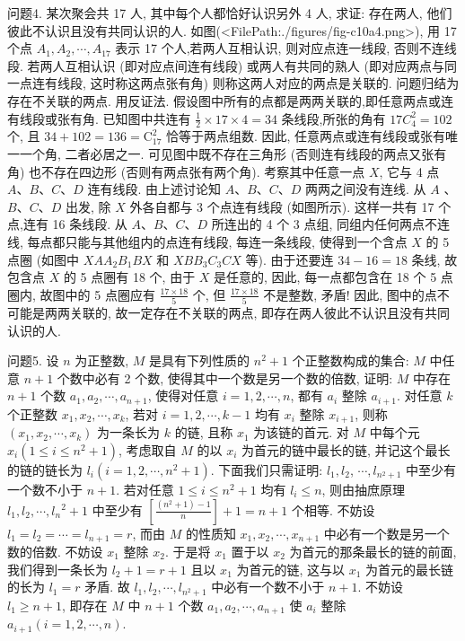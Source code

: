 问题4. 某次聚会共 17 人, 其中每个人都恰好认识另外 4 人, 求证: 存在两人, 他们彼此不认识且没有共同认识的人.
如图(<FilePath:./figures/fig-c10a4.png>), 用 17 个点 $A_1, A_2, \cdots, A_{17}$ 表示 17 个人,若两人互相认识, 则对应点连一线段, 否则不连线段.
若两人互相认识 (即对应点间连有线段) 或两人有共同的熟人 (即对应两点与同一点连有线段, 这时称这两点张有角) 则称这两人对应的两点是关联的.
问题归结为存在不关联的两点.
用反证法.
假设图中所有的点都是两两关联的,即任意两点或连有线段或张有角.
已知图中共连有 $\frac{1}{2} \times 17 \times 4=34$ 条线段,所张的角有 $17 C_4^2=102$ 个, 且 $34+102= 136=\mathrm{C}_{17}^2$ 恰等于两点组数.
因此, 任意两点或连有线段或张有唯一一个角, 二者必居之一.
可见图中既不存在三角形 (否则连有线段的两点又张有角) 也不存在四边形 (否则有两点张有两个角). 考察其中任意一点 $X$, 它与 4 点 $A 、 B 、 C 、 D$ 连有线段.
由上述讨论知 $A 、 B 、 C 、 D$ 两两之间没有连线.
从 $A$ 、 $B 、 C 、 D$ 出发, 除 $X$ 外各自都与 3 个点连有线段 (如图所示). 这样一共有 17 个点,连有 16 条线段.
从 $A 、 B 、 C 、 D$ 所连出的 4 个 3 点组, 同组内任何两点不连线, 每点都只能与其他组内的点连有线段, 每连一条线段, 使得到一个含点 $X$ 的 5 点圈 (如图中 $X A A_2 B_1 B X$ 和 $X B B_3 C_3 C X$ 等). 由于还要连 $34- 16=18$ 条线, 故包含点 $X$ 的 5 点圈有 18 个, 由于 $X$ 是任意的, 因此, 每一点都包含在 18 个 5 点圈内, 故图中的 5 点圈应有 $\frac{17 \times 18}{5}$ 个, 但 $\frac{17 \times 18}{5}$ 不是整数, 矛盾! 因此, 图中的点不可能是两两关联的, 故一定存在不关联的两点, 即存在两人彼此不认识且没有共同认识的人.



问题5. 设 $n$ 为正整数, $M$ 是具有下列性质的 $n^2+1$ 个正整数构成的集合: $M$ 中任意 $n+1$ 个数中必有 2 个数, 使得其中一个数是另一个数的倍数, 证明: $M$ 中存在 $n+1$ 个数 $a_1, a_2, \cdots, a_{n+1}$, 使得对任意 $i=1,2, \cdots, n$, 都有 $a_i$ 整除 $a_{i+1}$. 
对任意 $k$ 个正整数 $x_1, x_2, \cdots, x_k$, 若对 $i=1,2, \cdots, k-1$ 均有 $x_i$ 整除 $x_{i+1}$, 则称 $\left(x_1, x_2, \cdots, x_k\right)$ 为一条长为 $k$ 的链, 且称 $x_1$ 为该链的首元.
对 $M$ 中每个元 $x_i\left(1 \leqslant i \leqslant n^2+1\right)$, 考虑取自 $M$ 的以 $x_i$ 为首元的链中最长的链, 并记这个最长的链的链长为 $l_i\left(i=1,2, \cdots, n^2+1\right)$. 下面我们只需证明: $l_1, l_2$, $\cdots, l_{n^2+1}$ 中至少有一个数不小于 $n+1$. 若对任意 $1 \leqslant i \leqslant n^2+1$ 均有 $l_i \leqslant n$, 则由抽庶原理 $l_1, l_2, \cdots, l_n{ }^2+1$ 中至少有 $\left[\frac{\left(n^2+1\right)-1}{n}\right]+1=n+1$ 个相等.
不妨设 $l_1=l_2=\cdots=l_{n+1}=r$, 而由 $M$ 的性质知 $x_1, x_2, \cdots, x_{n+1}$ 中必有一个数是另一个数的倍数.
不妨设 $x_1$ 整除 $x_2$. 于是将 $x_1$ 置于以 $x_2$ 为首元的那条最长的链的前面, 我们得到一条长为 $l_2+1=r+1$ 且以 $x_1$ 为首元的链, 这与以 $x_1$ 为首元的最长链的长为 $l_1=r$ 矛盾.
故 $l_1, l_2, \cdots, l_{n^2+1}$ 中必有一个数不小于 $n+1$. 不妨设 $l_1 \geqslant n+1$, 即存在 $M$ 中 $n+1$ 个数 $a_1, a_2, \cdots, a_{n+1}$ 使 $a_i$ 整除 $a_{i+1}(i=1,2, \cdots, n)$.



